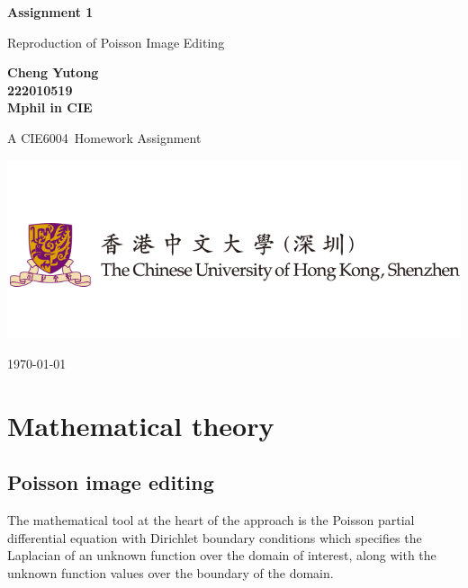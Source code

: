 \documentclass[10pt, a4paper]{article}%
\newcommand\course{CIE6004}                            %
\newcommand\hwnumber{1}                                 %
\newcommand\Information{Cheng Yutong\\222010519\\Mphil in CIE} %
\begin{document}
\begin{titlepage}
    \begin{center}
        \vspace*{3cm}
            
        \Huge
        \textbf{Assignment \hwnumber \ }
            
        \vspace{1cm}
        \huge
        
        Reproduction of Poisson Image Editing
            
        \vspace{1.5cm}
        \Large
            
        \textbf{\Information \ }                      %
        
            
        \vfill
        
        A \course \ Homework Assignment
            
        \vspace{1cm}
            
        \includegraphics[width=1\textwidth]{logo.png}
        \\
        
        \Large
        
        \today
            
    \end{center}
\end{titlepage}


\newpage
{
  \hypersetup{linkcolor=black}
  \tableofcontents
}

\newpage
\section{Mathematical theory}
\subsection{Poisson image editing}
The mathematical tool at the heart of the approach is the Poisson partial differential equation with Dirichlet boundary conditions which specifies the Laplacian of an unknown function over the domain of interest, along with the unknown function values over the boundary of the domain.
\end{document}
